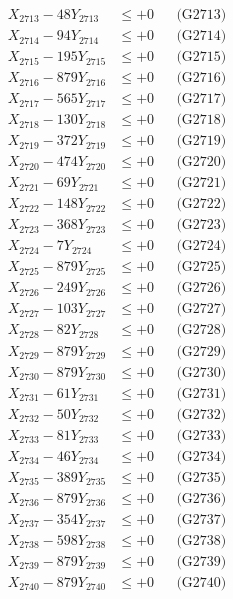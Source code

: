 \documentclass[a4paper,10pt]{article}
\begin{document}
{\begin{align}
X_{2713} - 48Y_{2713} &\leq +0 && \text{(G2713)} \\
X_{2714} - 94Y_{2714} &\leq +0 && \text{(G2714)} \\
X_{2715} - 195Y_{2715} &\leq +0 && \text{(G2715)} \\
X_{2716} - 879Y_{2716} &\leq +0 && \text{(G2716)} \\
X_{2717} - 565Y_{2717} &\leq +0 && \text{(G2717)} \\
X_{2718} - 130Y_{2718} &\leq +0 && \text{(G2718)} \\
X_{2719} - 372Y_{2719} &\leq +0 && \text{(G2719)} \\
X_{2720} - 474Y_{2720} &\leq +0 && \text{(G2720)} \\
\allowbreak
X_{2721} - 69Y_{2721} &\leq +0 && \text{(G2721)} \\
X_{2722} - 148Y_{2722} &\leq +0 && \text{(G2722)} \\
X_{2723} - 368Y_{2723} &\leq +0 && \text{(G2723)} \\
X_{2724} - 7Y_{2724} &\leq +0 && \text{(G2724)} \\
X_{2725} - 879Y_{2725} &\leq +0 && \text{(G2725)} \\
X_{2726} - 249Y_{2726} &\leq +0 && \text{(G2726)} \\
X_{2727} - 103Y_{2727} &\leq +0 && \text{(G2727)} \\
X_{2728} - 82Y_{2728} &\leq +0 && \text{(G2728)} \\
X_{2729} - 879Y_{2729} &\leq +0 && \text{(G2729)} \\
X_{2730} - 879Y_{2730} &\leq +0 && \text{(G2730)} \\
\allowbreak
X_{2731} - 61Y_{2731} &\leq +0 && \text{(G2731)} \\
X_{2732} - 50Y_{2732} &\leq +0 && \text{(G2732)} \\
X_{2733} - 81Y_{2733} &\leq +0 && \text{(G2733)} \\
X_{2734} - 46Y_{2734} &\leq +0 && \text{(G2734)} \\
X_{2735} - 389Y_{2735} &\leq +0 && \text{(G2735)} \\
X_{2736} - 879Y_{2736} &\leq +0 && \text{(G2736)} \\
X_{2737} - 354Y_{2737} &\leq +0 && \text{(G2737)} \\
X_{2738} - 598Y_{2738} &\leq +0 && \text{(G2738)} \\
X_{2739} - 879Y_{2739} &\leq +0 && \text{(G2739)} \\
X_{2740} - 879Y_{2740} &\leq +0 && \text{(G2740)} \\

\end{align}}
\end{document}
